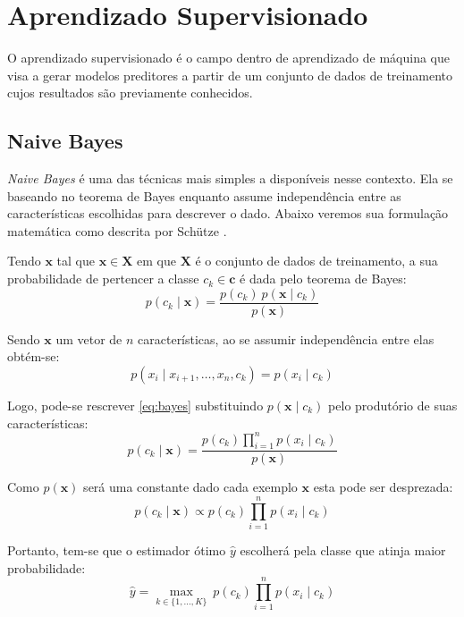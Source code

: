\section{Aprendizado Supervisionado}

O aprendizado supervisionado é o campo dentro de aprendizado de máquina que visa a gerar modelos preditores a partir de um conjunto de dados de treinamento cujos resultados são previamente conhecidos.

\subsection{Naive Bayes}

\textit{Naive Bayes} é uma das técnicas mais simples a disponíveis nesse contexto. Ela se baseando no teorema de Bayes enquanto assume independência entre as características escolhidas para descrever o dado. Abaixo veremos sua formulação matemática como descrita por Schütze \cite{schutze08}.

Tendo $\mathbf{x}$ tal que $\mathbf{x} \in \mathbf{X}$ em que $\mathbf{X}$ é o conjunto de dados de treinamento, a sua probabilidade de pertencer a classe $c_k \in \mathbf{c}$ é dada pelo teorema de Bayes:
\begin{equation} \label{eq:bayes}
    p(c_k \mid \mathbf{x}) = \frac{p(c_k) \ p(\mathbf{x} \mid c_k)}{p(\mathbf{x})}
\end{equation}

Sendo $\mathbf{x}$ um vetor de $n$ características, ao se assumir independência entre elas obtém-se:
\begin{equation}
    p(x_i \mid x_{i+1}, \dots ,x_{n}, c_k ) = p(x_i \mid c_k)
\end{equation}

Logo, pode-se rescrever \ref{eq:bayes} substituindo $p(\mathbf{x} \mid c_k)$ pelo produtório de suas características:
\begin{equation}
    p(c_k \mid \mathbf{x}) = \frac{p(c_k) \prod_{i=1}^n p(x_i \mid c_k)}{p(\mathbf{x})}
\end{equation}

Como $p(\mathbf{x})$ será uma constante dado cada exemplo $\mathbf{x}$ esta pode ser desprezada:
\begin{equation}
    p(c_k \mid \mathbf{x}) \propto p(c_k) \prod_{i=1}^n p(x_i \mid c_k)
\end{equation}

Portanto, tem-se que o estimador ótimo $\hat{y}$ escolherá pela classe que atinja maior probabilidade:
\begin{equation}
    \hat{y} = \underset{k \in \{1, \dots, K\}}{\operatorname{max}} \ p(c_k) \displaystyle\prod_{i=1}^n p(x_i \mid c_k)
\end{equation}

